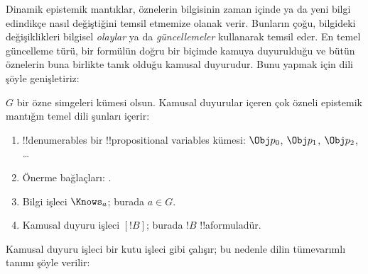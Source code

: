 



Dinamik epistemik mantıklar, öznelerin bilgisinin zaman içinde ya da yeni
bilgi edindikçe nasıl değiştiğini temsil etmemize olanak verir. Bunların
çoğu, bilgideki değişiklikleri bilgisel \emph{olaylar} ya da
\emph{güncellemeler} kullanarak temsil eder. En temel güncelleme türü, bir
formülün doğru bir biçimde kamuya duyurulduğu ve bütün öznelerin buna birlikte
tanık olduğu kamusal duyurudur. Bunu yapmak için dili şöyle genişletiriz:

\begin{defn}
$G$ bir özne simgeleri kümesi olsun. Kamusal duyurular içeren çok özneli
epistemik mantığın temel dili şunları içerir:
\begin{enumerate}
  \item !!{denumerable}s bir !!{propositional variable}s kümesi: $\Obj
    p_0$, $\Obj p_1$, $\Obj p_2$, \dots
  \item Önerme bağlaçları: \startycommalist
  .
  \item Bilgi işleci $\Knows_a$; burada $a \in G$.
  \item Kamusal duyuru işleci $[!B]$; burada $!B$ !!a{formula}{}dür.
\end{enumerate}
\end{defn}

Kamusal duyuru işleci bir kutu işleci gibi çalışır; bu nedenle dilin
tümevarımlı tanımı şöyle verilir:

